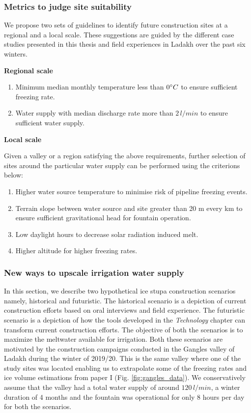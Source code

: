 \subsubsection{Metrics to judge site suitability}

We propose two sets of guidelines to identify future construction sites at a regional and a local scale. These
suggestions are guided by the different case studies presented in this thesis and field experiences in
Ladakh over the past six winters.

\textbf{Regional scale}

\begin{enumerate}

	\item Minimum median monthly temperature less than $0 ^{\circ} C$ to ensure sufficient freezing rate.
	\item Water supply with median discharge rate more than $2\, l/min$ to ensure sufficient water supply.

\end{enumerate}

\textbf{Local scale}

Given a valley or a region satisfying the above requirements, further selection of sites around the particular
water supply can be performed using the criterions below:

\begin{enumerate}
	\item Higher water source temperature to minimise risk of pipeline freezing events.
	\item Terrain slope between water source and site greater than 20 m every km to ensure sufficient
    gravitational head for fountain operation.
	\item Low daylight hours to decrease solar radiation induced melt.
	\item Higher altitude for higher freezing rates.
\end{enumerate}

\subsubsection{New ways to upscale irrigation water supply}

In this section, we describe two hypothetical ice stupa construction scenarios namely, historical and
futuristic. The historical scenario is a depiction of current construction efforts based on oral interviews and
field experience. The futuristic scenario is a depiction of how the tools developed in the \textit{Technology}
chapter can transform current construction efforts. The objective of both the scenarios is to maximize the
meltwater available for irrigation. Both these scenarios are motivated by the construction campaigns conducted
in the Gangles valley of Ladakh during the winter of 2019/20. This is the same valley where one of the study
sites was located enabling us to extrapolate some of the freezing rates and ice volume estimations from paper I
(Fig. \ref{fig:gangles_data}). We conservatively assume that the valley had a total water supply of around
$120\,l/min$, a winter duration of 4 months and the fountain was operational for only 8 hours per day for both
the scenarios. 

